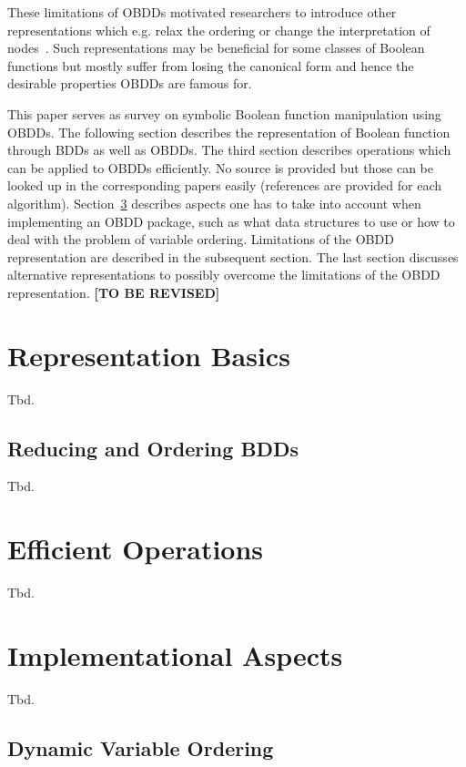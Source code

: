 \documentclass{vldb}
\newcommand{\tbr}{\textbf{[TO BE REVISED]}}
\begin{document}
These limitations of OBDDs motivated researchers to introduce other
representations which e.g. relax the ordering or change the interpretation of
nodes~\cite{BRYANT95}. Such representations may be beneficial for some classes
of Boolean functions but mostly suffer from losing the canonical form and hence
the desirable properties OBDDs are famous for.

This paper serves as survey on symbolic Boolean function manipulation using OBDDs.
The following section describes the representation of Boolean function through
BDDs as well as OBDDs. The third section describes operations which can be applied
to OBDDs efficiently. No source is provided but those can be looked up in the
corresponding papers easily (references are provided for each algorithm).
Section~\ref{sec:implementation-aspects} describes aspects one has to take into
account when implementing an OBDD package, such as what data structures to use
or how to deal with the problem of variable ordering. Limitations of the OBDD
representation are described in the subsequent section. The last section
discusses alternative representations to possibly overcome the limitations of
the OBDD representation.
\tbr

\section{Representation Basics}
\label{sec:representation-basics}

Tbd.

\subsection{Reducing and Ordering BDDs}
\label{subsec:reducing-and-ordering-bdds}

Tbd.

\section{Efficient Operations}
\label{sec:efficient-operations}

Tbd.

\section{Implementational Aspects}
\label{sec:implementation-aspects}

Tbd.

\subsection{Dynamic Variable Ordering}
\label{subsec:dynamic-variable-ordering}
\end{document}
